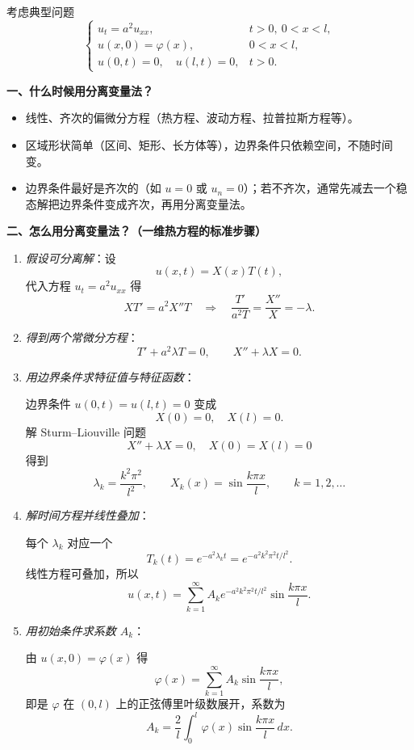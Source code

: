考虑典型问题
\[
\begin{cases}
u_t = a^2 u_{xx}, & t>0,\ 0<x<l,\\[2pt]
u(x,0)=\varphi(x), & 0<x<l,\\[2pt]
u(0,t)=0,\quad u(l,t)=0, & t>0.
\end{cases}
\]

\textbf{一、什么时候用分离变量法？}
\begin{itemize}
  \item 线性、齐次的偏微分方程（热方程、波动方程、拉普拉斯方程等）。
  \item 区域形状简单（区间、矩形、长方体等），边界条件只依赖空间，不随时间变。
  \item 边界条件最好是齐次的（如 $u=0$ 或 $u_n=0$）；若不齐次，通常先减去一个稳态解把边界条件变成齐次，再用分离变量法。
\end{itemize}

\textbf{二、怎么用分离变量法？（一维热方程的标准步骤）}
\begin{enumerate}
  \item \emph{假设可分离解}：设
  \[
    u(x,t)=X(x)T(t),
  \]
  代入方程 $u_t=a^2u_{xx}$ 得
  \[
    X T' = a^2 X'' T \quad\Rightarrow\quad
    \frac{T'}{a^2 T} = \frac{X''}{X} = -\lambda.
  \]

  \item \emph{得到两个常微分方程}：
  \[
    T' + a^2\lambda T=0,\qquad X'' + \lambda X =0.
  \]

  \item \emph{用边界条件求特征值与特征函数}：

  边界条件 $u(0,t)=u(l,t)=0$ 变成
  \[
    X(0)=0,\quad X(l)=0.
  \]
  解 Sturm–Liouville 问题
  \[
    X''+\lambda X=0,\quad X(0)=X(l)=0
  \]
  得到
  \[
    \lambda_k=\frac{k^2\pi^2}{l^2},\qquad
    X_k(x)=\sin\frac{k\pi x}{l},\qquad k=1,2,\dots
  \]

  \item \emph{解时间方程并线性叠加}：

  每个 $\lambda_k$ 对应一个
  \[
    T_k(t)=e^{-a^2\lambda_k t}=e^{-a^2 k^2\pi^2 t/l^2}.
  \]
  线性方程可叠加，所以
  \[
    u(x,t)=\sum_{k=1}^\infty A_k e^{-a^2 k^2\pi^2 t/l^2}\sin\frac{k\pi x}{l}.
  \]

  \item \emph{用初始条件求系数 $A_k$}：

  由 $u(x,0)=\varphi(x)$ 得
  \[
    \varphi(x)=\sum_{k=1}^\infty A_k\sin\frac{k\pi x}{l},
  \]
  即是 $\varphi$ 在 $(0,l)$ 上的正弦傅里叶级数展开，系数为
  \[
    A_k=\frac{2}{l}\int_0^l \varphi(x)\sin\frac{k\pi x}{l}\,dx.
  \]
\end{enumerate}

